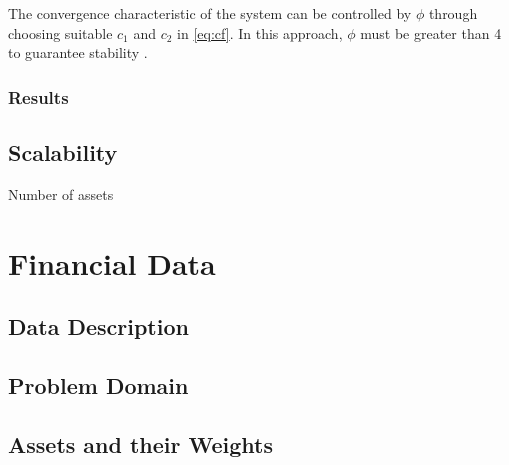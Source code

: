 \documentclass{pdfmx4020}
\begin{document}
    The convergence characteristic of the system can be controlled by $\phi$ through choosing suitable $c_1$ and $c_2$ in \eqref{eq:cf}. In this approach, $\phi$ must be greater than 4 to guarantee stability \cite{constriction_factor_2}. 


    \subsection{Results}

  \section{Scalability} %
  \label{sec:scalability}
    Number of assets



\chapter{Financial Data}
  \section{Data Description} %
  \label{sec:data_description}
  

  \section{Problem Domain} %
  \label{sec:problem_domain}
  

  \section{Assets and their Weights} %
  \label{sec:assets_and_their_weights}
  
\end{document}
